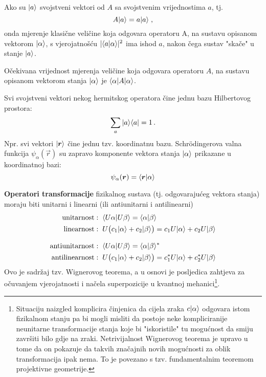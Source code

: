 Ako su $| a \rangle$ svojstveni vektori od $A$ sa svojstvenim vrijednostima
$a$, tj.
\begin{displaymath}
                A| a \rangle=a| a \rangle \;,
\end{displaymath}
onda mjerenje klasične veličine koja odgovara operatoru A, na sustavu
opisanom vektorom $| \alpha \rangle$, s vjerojatnošću $|\langle a |\alpha\rangle|^2$
ima ishod $a$, nakon čega sustav "skače" u stanje $| a \rangle$.

Očekivana vrijednost mjerenja veličine koja odgovara
operatoru $A$, na sustavu opisanom vektorom stanja
$| \alpha \rangle$ je $\langle \alpha |A| \alpha \rangle$.

Svi svojstveni vektori nekog hermitskog operatora čine jednu bazu
Hilbertovog prostora:
\begin{displaymath}
             \sum_{a} | a \rangle\langle a | = 1 \,.
\end{displaymath}
Npr. svi vektori $\ket{\vec{r}}$ čine jednu tzv. koordinatnu bazu.
Schr\"{o}dingerova valna funkcija $\psi_{\alpha}(\vec{r})$ su zapravo
komponente vektora stanja $| \alpha \rangle$ prikazane u koordinatnoj
bazi:
\begin{displaymath}
            \psi_{\alpha}(\vec{r})=\bra{\vec{r}}\alpha\rangle
\end{displaymath}


\textbf{Operatori transformacije} fizikalnog sustava (tj. odgovarajućeg vektora
stanja) moraju biti unitarni i linearni (ili antiunitarni i antilinearni)
\begin{align*}
\text{unitarnost}&:\; \langle U\alpha |U\beta\rangle = \langle \alpha |\beta\rangle
   \\
\text{linearnost}&:\; U\big(c_1| \alpha \rangle+c_{2}| \beta \rangle\big)=
  c_1 U| \alpha \rangle + c_{2} U| \beta \rangle
   \\[2ex]
\text{antiunitarnost}&:\; \langle U\alpha |U\beta\rangle = \langle \alpha |\beta\rangle^*
  \\
\text{antilinearnost}&:\; U\big(c_1| \alpha \rangle+c_{2}| \beta \rangle\big)=
  c_{1}^* U| \alpha \rangle + c_{2}^* U| \beta \rangle
\end{align*}
Ovo je sadržaj tzv. Wignerovog teorema, a u osnovi
je posljedica zahtjeva za očuvanjem vjerojatnosti i
načela superpozicije u kvantnoj mehanici\footnote{Situaciju
naizgled komplicira činjenica da cijela zraka
$c| \alpha \rangle$ odgovara istom fizikalnom stanju pa bi mogli
misliti da postoje neke kompliciranije neunitarne transformacije stanja
koje bi "iskoristile" tu
mogućnost da smiju završiti bilo gdje na zraki. Netrivijalnost
Wignerovog teorema je upravo u tome da on pokazuje da takvih
značajnih novih mogućnosti za oblik transformacija ipak nema. To
je povezano s tzv. fundamentalnim teoremom projektivne geometrije.}.

